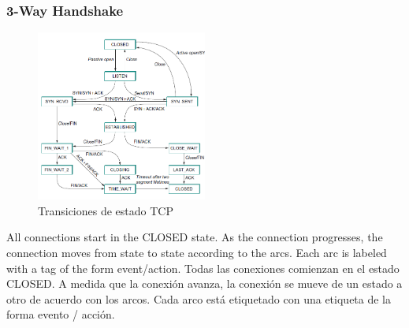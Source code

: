 \subsubsection*{3-Way Handshake}
\begin{figure}[H]
	\centering
	\includegraphics[width=0.5\textwidth
]{images/tcp-state-transitions.png}
	\caption[Transiciones de estado TCP]{Transiciones de estado TCP}
	\label{fig:tcp-state-transitions}
\end{figure}


\newpage

All
connections start in the CLOSED state. As the connection progresses, the
connection moves from state to state according to the arcs. Each arc is
labeled with a tag of the form event/action.
Todas las conexiones comienzan en el estado CLOSED. A medida que la conexión avanza, la conexión se mueve de un estado a otro de acuerdo con los arcos. Cada arco está etiquetado con una etiqueta de la forma evento / acción.